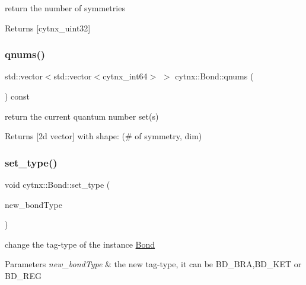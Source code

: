 return the number of symmetries 

\begin{DoxyReturn}{Returns}
\mbox{[}cytnx\+\_\+uint32\mbox{]} 
\end{DoxyReturn}
\mbox{\label{classcytnx_1_1Bond_ac33a7bc780a4c7afba2b6d2d571bf23e}} 
\subsubsection{\texorpdfstring{qnums()}{qnums()}}
{\footnotesize\ttfamily std\+::vector$<$std\+::vector$<$cytnx\+\_\+int64$>$ $>$ cytnx\+::\+Bond\+::qnums (\begin{DoxyParamCaption}{ }\end{DoxyParamCaption}) const\hspace{0.3cm}{\ttfamily [inline]}}



return the current quantum number set(s) 

\begin{DoxyReturn}{Returns}
\mbox{[}2d vector\mbox{]} with shape\+: (\# of symmetry, dim) 
\end{DoxyReturn}
\mbox{\label{classcytnx_1_1Bond_ae6957c3902bf12fd27ab881db3fe5243}} 
\subsubsection{\texorpdfstring{set\+\_\+type()}{set\_type()}}
{\footnotesize\ttfamily void cytnx\+::\+Bond\+::set\+\_\+type (\begin{DoxyParamCaption}\item[{const bond\+Type \&}]{new\+\_\+bond\+Type }\end{DoxyParamCaption})\hspace{0.3cm}{\ttfamily [inline]}}



change the tag-\/type of the instance \hyperlink{classcytnx_1_1Bond}{Bond} 


\begin{DoxyParams}{Parameters}
{\em new\+\_\+bond\+Type} & the new tag-\/type, it can be B\+D\+\_\+\+B\+RA,B\+D\+\_\+\+K\+ET or B\+D\+\_\+\+R\+EG \\
\hline
\end{DoxyParams}
\mbox{\label{classcytnx_1_1Bond_ad0adf7b134654f0390e98695ba4d416e}} 
